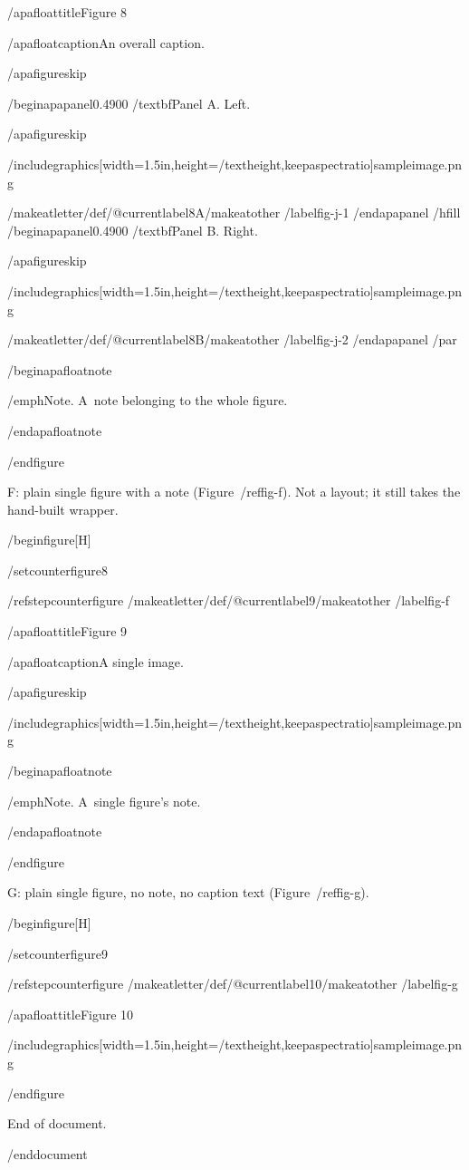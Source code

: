 /apafloattitle{Figure 8}

/apafloatcaption{An overall caption.}

/apafigureskip

/begin{apapanel}{0.4900}%
/textbf{Panel A}. Left.

/apafigureskip

/includegraphics[width=1.5in,height=/textheight,keepaspectratio]{sampleimage.png}

/makeatletter/def/@currentlabel{8A}/makeatother%
/label{fig-j-1}
/end{apapanel}%
/hfill
/begin{apapanel}{0.4900}%
/textbf{Panel B}. Right.

/apafigureskip

/includegraphics[width=1.5in,height=/textheight,keepaspectratio]{sampleimage.png}

/makeatletter/def/@currentlabel{8B}/makeatother%
/label{fig-j-2}
/end{apapanel}%
/par

/begin{apafloatnote}

/emph{Note}. A~note belonging to the whole figure.

/end{apafloatnote}

/end{figure}

F: plain single figure with a note (Figure~/ref{fig-f}). Not a layout;
it still takes the hand-built wrapper.

/begin{figure}[H]

/setcounter{figure}{8}

/refstepcounter{figure}%
/makeatletter/def/@currentlabel{9}/makeatother%
/label{fig-f}

/apafloattitle{Figure 9}

/apafloatcaption{A single image.}

/apafigureskip

/includegraphics[width=1.5in,height=/textheight,keepaspectratio]{sampleimage.png}

/begin{apafloatnote}

/emph{Note}. A~single figure's note.

/end{apafloatnote}

/end{figure}

G: plain single figure, no note, no caption text (Figure~/ref{fig-g}).

/begin{figure}[H]

/setcounter{figure}{9}

/refstepcounter{figure}%
/makeatletter/def/@currentlabel{10}/makeatother%
/label{fig-g}

/apafloattitle{Figure 10}

/includegraphics[width=1.5in,height=/textheight,keepaspectratio]{sampleimage.png}

/end{figure}

End of document.




/end{document}

